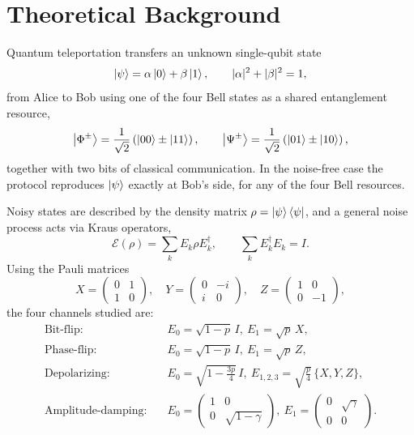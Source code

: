 \documentclass[11pt]{article}
\begin{document}
\section{Theoretical Background}

Quantum teleportation transfers an unknown single-qubit state
\begin{equation}
\ket{\psi} = \alpha\ket{0} + \beta\ket{1}, \qquad |\alpha|^2+|\beta|^2=1,
\label{eq:input}
\end{equation}
from Alice to Bob using one of the four Bell states as a shared entanglement resource,
\begin{equation}
\ket{\Phi^\pm} = \frac{1}{\sqrt2}\left(\ket{00}\pm\ket{11}\right), \qquad
\ket{\Psi^\pm} = \frac{1}{\sqrt2}\left(\ket{01}\pm\ket{10}\right),
\label{eq:bellstates}
\end{equation}
together with two bits of classical communication. In the noise-free case the protocol reproduces $\ket{\psi}$ exactly at Bob's side, for any of the four Bell resources.

Noisy states are described by the density matrix $\rho=\ket{\psi}\bra{\psi}$, and a general noise process acts via Kraus operators,
\begin{equation}
\mathcal{E}(\rho) = \sum_k E_k \rho E_k^\dagger, \qquad \sum_k E_k^\dagger E_k = I.
\label{eq:kraus}
\end{equation}
Using the Pauli matrices
\begin{equation}
X=\begin{pmatrix}0&1\\1&0\end{pmatrix},\quad
Y=\begin{pmatrix}0&-i\\i&0\end{pmatrix},\quad
Z=\begin{pmatrix}1&0\\0&-1\end{pmatrix},
\label{eq:pauli}
\end{equation}
the four channels studied are:
\begin{align}
\text{Bit-flip:} \quad & E_0=\sqrt{1-p}\,I,\ E_1=\sqrt{p}\,X, \label{eq:bf-kraus}\\
\text{Phase-flip:} \quad & E_0=\sqrt{1-p}\,I,\ E_1=\sqrt{p}\,Z, \label{eq:pf-kraus}\\
\text{Depolarizing:} \quad & E_0=\sqrt{1-\tfrac{3p}{4}}\,I,\ E_{1,2,3}=\sqrt{\tfrac{p}{4}}\,\{X,Y,Z\}, \label{eq:dp-kraus}\\
\text{Amplitude-damping:} \quad & E_0=\begin{pmatrix}1&0\\0&\sqrt{1-\gamma}\end{pmatrix},\ E_1=\begin{pmatrix}0&\sqrt{\gamma}\\0&0\end{pmatrix}. \label{eq:ad-kraus}
\end{align}
\end{document}
